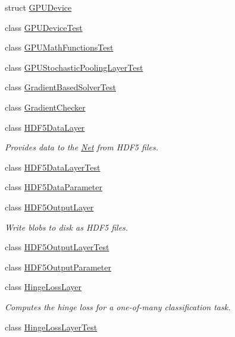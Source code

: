 \begin{DoxyCompactItemize}
\item 
struct \mbox{\hyperlink{structcaffe_1_1_g_p_u_device}{G\+P\+U\+Device}}
\item 
class \mbox{\hyperlink{classcaffe_1_1_g_p_u_device_test}{G\+P\+U\+Device\+Test}}
\item 
class \mbox{\hyperlink{classcaffe_1_1_g_p_u_math_functions_test}{G\+P\+U\+Math\+Functions\+Test}}
\item 
class \mbox{\hyperlink{classcaffe_1_1_g_p_u_stochastic_pooling_layer_test}{G\+P\+U\+Stochastic\+Pooling\+Layer\+Test}}
\item 
class \mbox{\hyperlink{classcaffe_1_1_gradient_based_solver_test}{Gradient\+Based\+Solver\+Test}}
\item 
class \mbox{\hyperlink{classcaffe_1_1_gradient_checker}{Gradient\+Checker}}
\item 
class \mbox{\hyperlink{classcaffe_1_1_h_d_f5_data_layer}{H\+D\+F5\+Data\+Layer}}
\begin{DoxyCompactList}\small\item\em Provides data to the \mbox{\hyperlink{classcaffe_1_1_net}{Net}} from H\+D\+F5 files. \end{DoxyCompactList}\item 
class \mbox{\hyperlink{classcaffe_1_1_h_d_f5_data_layer_test}{H\+D\+F5\+Data\+Layer\+Test}}
\item 
class \mbox{\hyperlink{classcaffe_1_1_h_d_f5_data_parameter}{H\+D\+F5\+Data\+Parameter}}
\item 
class \mbox{\hyperlink{classcaffe_1_1_h_d_f5_output_layer}{H\+D\+F5\+Output\+Layer}}
\begin{DoxyCompactList}\small\item\em Write blobs to disk as H\+D\+F5 files. \end{DoxyCompactList}\item 
class \mbox{\hyperlink{classcaffe_1_1_h_d_f5_output_layer_test}{H\+D\+F5\+Output\+Layer\+Test}}
\item 
class \mbox{\hyperlink{classcaffe_1_1_h_d_f5_output_parameter}{H\+D\+F5\+Output\+Parameter}}
\item 
class \mbox{\hyperlink{classcaffe_1_1_hinge_loss_layer}{Hinge\+Loss\+Layer}}
\begin{DoxyCompactList}\small\item\em Computes the hinge loss for a one-\/of-\/many classification task. \end{DoxyCompactList}\item 
class \mbox{\hyperlink{classcaffe_1_1_hinge_loss_layer_test}{Hinge\+Loss\+Layer\+Test}}

\end{DoxyCompactItemize}
